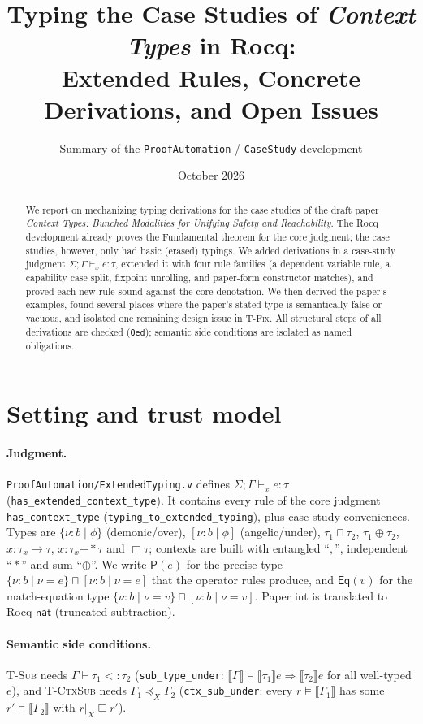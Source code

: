 \documentclass[10pt]{article}
\title{Typing the Case Studies of \emph{Context Types} in Rocq:\\
Extended Rules, Concrete Derivations, and Open Issues}
\author{Summary of the \texttt{ProofAutomation} / \texttt{CaseStudy} development}
\date{October 2026}
\newcommand{\ov}[2]{\{\nu{:}#1 \mid #2\}}          %
\newcommand{\un}[2]{[\nu{:}#1 \mid #2]}            %
\newcommand{\Prec}[1]{\mathsf{P}(#1)}               %
\newcommand{\Eq}[1]{\mathsf{Eq}(#1)}                %
\newcommand{\Nat}{\mathsf{nat}}
\newcommand{\wand}{\mathrel{-\!\!*}}
\newcommand{\inter}{\sqcap}
\newcommand{\Sum}{\oplus}
\newcommand{\pers}{\Box}
\newcommand{\entc}{\mathrel{,}}
\newcommand{\sep}{\mathrel{*}}
\newcommand{\vd}{\vdash_{\!x}}
\newcommand{\den}[1]{\llbracket #1 \rrbracket}
\newcommand{\ctxsub}[1]{\mathrel{\preceq_{#1}}}
\newcommand{\sub}{\mathrel{<:}}
\newcommand{\rocq}[1]{\texttt{#1}}
\newcommand{\RN}[1]{\textsc{#1}}
\begin{document}
\maketitle

\begin{abstract}
We report on mechanizing typing derivations for the case studies of the draft
paper \emph{Context Types: Bunched Modalities for Unifying Safety and
Reachability}. The Rocq development already proves the Fundamental theorem for
the core judgment; the case studies, however, only had basic (erased) typings.
We added derivations in a case-study judgment $\Sigma;\Gamma \vd e : \tau$,
extended it with four rule families (a dependent variable rule, a
capability case split, fixpoint unrolling, and paper-form constructor matches),
and proved each new rule sound against the core denotation. We then derived
the paper's examples, found several places where the paper's stated type is
semantically false or vacuous, and isolated one remaining design issue in
\RN{T-Fix}. All structural steps of all derivations are checked (\rocq{Qed});
semantic side conditions are isolated as named obligations.
\end{abstract}

\section{Setting and trust model}

\paragraph{Judgment.} \rocq{ProofAutomation/ExtendedTyping.v} defines
$\Sigma;\Gamma\vd e:\tau$ (\rocq{has\_extended\_context\_type}). It contains
every rule of the core judgment \rocq{has\_context\_type}
(\rocq{typing\_to\_extended\_typing}), plus case-study conveniences. Types are
$\ov{b}{\phi}$ (demonic/over), $\un{b}{\phi}$ (angelic/under), $\tau_1\inter\tau_2$,
$\tau_1\Sum\tau_2$, $x{:}\tau_x\to\tau$, $x{:}\tau_x\wand\tau$ and $\pers\tau$;
contexts are built with entangled ``$\entc$'', independent ``$\sep$'' and sum
``$\Sum$''. We write $\Prec{e}$ for the precise type
$\ov{b}{\nu = e}\inter\un{b}{\nu = e}$ that the operator rules produce, and
$\Eq{v}$ for the match-equation type $\ov{b}{\nu=v}\inter\un{b}{\nu=v}$.
Paper \textsf{int} is translated to Rocq $\Nat$ (truncated subtraction).

\paragraph{Semantic side conditions.} \RN{T-Sub} needs
$\Gamma\vdash\tau_1\sub\tau_2$ (\rocq{sub\_type\_under}: $\den{\Gamma}\models\den{\tau_1}e\Rightarrow\den{\tau_2}e$
for all well-typed $e$), and \RN{T-CtxSub} needs
$\Gamma_1\ctxsub{X}\Gamma_2$ (\rocq{ctx\_sub\_under}: every
$r\models\den{\Gamma_1}$ has some $r'\models\den{\Gamma_2}$ with $r|_X\sqsubseteq r'$).
\end{document}
